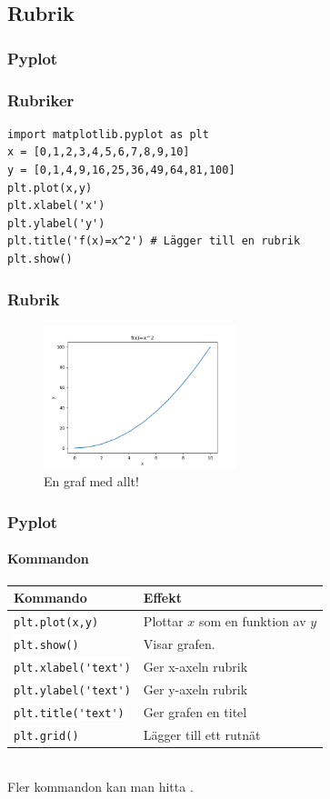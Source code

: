 \documentclass[aspectratio=169]{beamer}
\newcommand{\code}[1]{\colorbox{white}{\lstinline{#1}}}
\begin{document}
\subsection{Rubrik}

\begin{frame}[fragile]
\frametitle{Pyplot}
\frametitle{Rubriker}

\begin{lstlisting}
import matplotlib.pyplot as plt
x = [0,1,2,3,4,5,6,7,8,9,10]
y = [0,1,4,9,16,25,36,49,64,81,100]
plt.plot(x,y)
plt.xlabel('x')
plt.ylabel('y')
plt.title('f(x)=x^2') # Lägger till en rubrik
plt.show()
\end{lstlisting}

\end{frame}

\begin{frame}
\frametitle{Rubrik}

\begin{figure}
\includegraphics[width = 0.5\textwidth]{squares3.png}
\caption{En graf med allt!}
\end{figure}

\end{frame}

\begin{frame}
\frametitle{Pyplot}
\framesubtitle{Kommandon}

\begin{tabular}{| l | p{7cm}|}
\hline
\textbf{Kommando}	& \textbf{Effekt}\\ \hline
\code{plt.plot(x,y)}	& Plottar $x$ som en funktion av $y$\\
\code{plt.show()}	& Visar grafen.\\
\code{plt.xlabel('text')} & Ger x-axeln rubrik\\
\code{plt.ylabel('text')} & Ger y-axeln rubrik\\
\code{plt.title('text')}	& Ger grafen en titel\\
\code{plt.grid()}		& Lägger till ett rutnät\\ \hline
\end{tabular}\\

Fler kommandon kan man hitta .

\end{frame}
\end{document}
